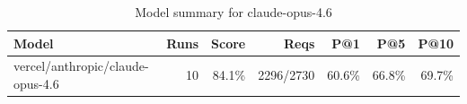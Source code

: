 \begin{table}[htbp]
\centering
\begin{tabular}{lrrrrrr}
\toprule
Model & Runs & Score & Reqs & P@1 & P@5 & P@10 \\
\midrule
vercel/anthropic/claude-opus-4.6 & 10 & 84.1\% & 2296/2730 & 60.6\% & 66.8\% & 69.7\% \\
\bottomrule
\end{tabular}
\caption{Model summary for claude-opus-4.6}
\end{table}
